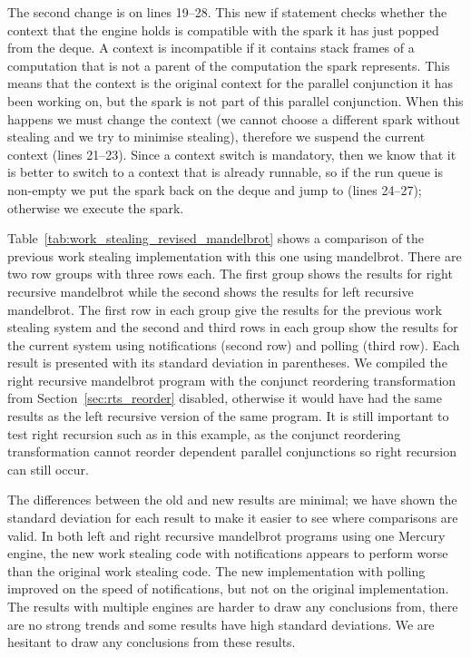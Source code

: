 The second change is on lines 19--28.
This new if statement checks whether the context that the engine holds is
compatible with the spark it has just popped from the deque.
A context is incompatible if it contains stack frames of a computation that
is not a parent of the computation the spark represents.
This means that the context is the original context for the parallel
conjunction it has been working on,
but the spark is not part of this parallel conjunction.
When this happens we must change the context
(we cannot choose a different spark without stealing and we try to minimise
stealing),
therefore we suspend the current context (lines 21--23).
Since a context switch is mandatory, then we know that it is better to
switch to a context that is already runnable,
so if the run queue is non-empty we put the spark back on the deque and jump
to \idle (lines 24--27);
otherwise we execute the spark.



Table~\ref{tab:work_stealing_revised_mandelbrot} shows a comparison of the previous
work stealing implementation with this one using mandelbrot.
There are two row groups with three rows each.
The first group shows the results for right recursive mandelbrot while the
second shows the results for left recursive mandelbrot.
The first row in each group give the results for the previous work stealing
system and
the second and third rows in each group show the results for the current
system using notifications (second row) and polling (third row).
Each result is presented with its standard deviation in parentheses.
We compiled the right recursive mandelbrot program with the conjunct
reordering transformation from Section~\ref{sec:rts_reorder} disabled,
otherwise it would have had the same results as the left recursive version
of the same program.
It is still important to test right recursion such as in this example,
as the conjunct reordering transformation cannot reorder dependent parallel
conjunctions so right recursion can still occur.

The differences between the old and new results are minimal;
we have shown the standard deviation for each result to make it easier to
see where comparisons are valid.
In both left and right recursive mandelbrot programs using one Mercury
engine,
the new work stealing code with notifications appears to perform worse than
the original work stealing code.
The new implementation with polling improved on the speed of notifications,
but not on the original implementation.
The results with multiple engines are harder to draw any conclusions from,
there are no strong trends and some results have high standard deviations.
We are hesitant to draw any conclusions from these results.


